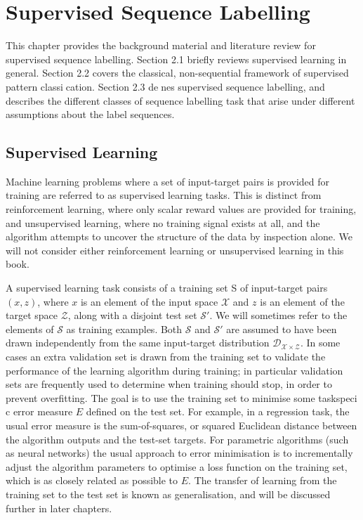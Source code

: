\chapter{Supervised Sequence Labelling}
This chapter provides the background material and literature review for supervised sequence labelling. Section 2.1 briefly reviews supervised learning in general. Section 2.2 covers the classical, non-sequential framework of supervised pattern classication. Section 2.3 denes supervised sequence labelling, and describes the different classes of sequence labelling task that arise under different assumptions about the label sequences.

\section{Supervised Learning}
Machine learning problems where a set of input-target pairs is provided for training are referred to as supervised learning tasks. This is distinct from reinforcement learning, where only scalar reward values are provided for training, and unsupervised learning, where no training signal exists at all, and the algorithm attempts to uncover the structure of the data by inspection alone. We will not consider either reinforcement learning or unsupervised learning in this book.

A supervised learning task consists of a training set S of input-target pairs $(x, z)$, where $x$ is an element of the input space $\mathcal{X}$ and $z$ is an element of the target space $\mathcal{Z}$, along with a disjoint test set $\mathcal{S}'$. We will sometimes refer to the elements of $\mathcal{S}$ as training examples. Both $\mathcal{S}$ and $\mathcal{S}'$ are assumed to have been drawn independently from the same input-target distribution $\mathcal{D}_{\mathcal{X}\times\mathcal{Z}}$. In some cases an extra validation set is drawn from the training set to validate the performance of the learning algorithm during training; in particular validation sets are frequently used to determine when training should stop, in order to prevent overfitting. The goal is to use the training set to minimise some taskspeci c error measure $E$ defined on the test set. For example, in a regression task, the usual error measure is the sum-of-squares, or squared Euclidean distance between the algorithm outputs and the test-set targets. For parametric algorithms (such as neural networks) the usual approach to error minimisation is to incrementally adjust the algorithm parameters to optimise a loss function on the training set, which is as closely related as possible to $E$. The transfer of learning from the training set to the test set is known as generalisation, and will be discussed further in later chapters.

